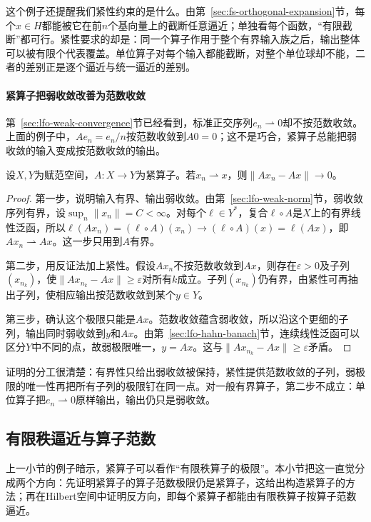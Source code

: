 这个例子还提醒我们紧性约束的是什么。由第~\ref{sec:fs-orthogonal-expansion}节，每个$x\in H$都能被它在前$n$个基向量上的截断任意逼近；单独看每个函数，“有限截断”都可行。紧性要求的却是：同一个算子作用于整个有界输入族之后，输出整体可以被有限个代表覆盖。单位算子对每个输入都能截断，对整个单位球却不能，二者的差别正是逐个逼近与统一逼近的差别。

\paragraph{紧算子把弱收敛改善为范数收敛}
第~\ref{sec:lfo-weak-convergence}节已经看到，标准正交序列$e_n\rightharpoonup0$却不按范数收敛。上面的例子中，$Ae_n=e_n/n$按范数收敛到$A0=0$；这不是巧合，紧算子总能把弱收敛的输入变成按范数收敛的输出。

\begin{theorem}[紧算子改善收敛]
\label{thm:ose-compact-weak-strong}
设$X,Y$为赋范空间，$A:X\to Y$为紧算子。若$x_n\rightharpoonup x$，则$\|Ax_n-Ax\|\to0$。
\end{theorem}

\begin{proof}
第一步，说明输入有界、输出弱收敛。由第~\ref{sec:lfo-weak-norm}节，弱收敛序列有界，设$\sup_n\|x_n\|=C<\infty$。对每个$\ell\in Y^*$，复合$\ell\circ A$是$X$上的有界线性泛函，所以$\ell(Ax_n)=(\ell\circ A)(x_n)\to(\ell\circ A)(x)=\ell(Ax)$，即$Ax_n\rightharpoonup Ax$。这一步只用到$A$有界。

第二步，用反证法加上紧性。假设$Ax_n$不按范数收敛到$Ax$，则存在$\varepsilon>0$及子列$(x_{n_k})$，使$\|Ax_{n_k}-Ax\|\geq\varepsilon$对所有$k$成立。子列$(x_{n_k})$仍有界，由紧性可再抽出子列，使相应输出按范数收敛到某个$y\in Y$。

第三步，确认这个极限只能是$Ax$。范数收敛蕴含弱收敛，所以沿这个更细的子列，输出同时弱收敛到$y$和$Ax$。由第~\ref{sec:lfo-hahn-banach}节，连续线性泛函可以区分$Y$中不同的点，故弱极限唯一，$y=Ax$。这与$\|Ax_{n_k}-Ax\|\geq\varepsilon$矛盾。
\end{proof}

证明的分工很清楚：有界性只给出弱收敛被保持，紧性提供范数收敛的子列，弱极限的唯一性再把所有子列的极限钉在同一点。对一般有界算子，第二步不成立：单位算子把$e_n\rightharpoonup0$原样输出，输出仍只是弱收敛。

\subsection{有限秩逼近与算子范数}
\label{sec:ose-finite-rank}

上一小节的例子暗示，紧算子可以看作“有限秩算子的极限”。本小节把这一直觉分成两个方向：先证明紧算子的算子范数极限仍是紧算子，这给出构造紧算子的方法；再在Hilbert空间中证明反方向，即每个紧算子都能由有限秩算子按算子范数逼近。

